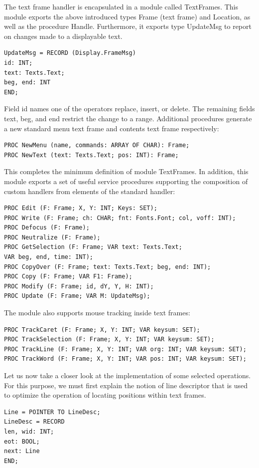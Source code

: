 The text frame handler is encapsulated in a module called TextFrames. This module exports the
above introduced types Frame (text frame) and Location, as well as the procedure Handle.
Furthermore, it exports type UpdateMsg to report on changes made to a displayable text.
\begin{verbatim}
UpdateMsg = RECORD (Display.FrameMsg)
id: INT;
text: Texts.Text;
beg, end: INT
END;
\end{verbatim}

Field id names one of the operators replace, insert, or delete. The remaining fields text, beg, and
end restrict the change to a range. Additional procedures generate a new standard menu text frame
and contents text frame respectively:
\begin{verbatim}
PROC NewMenu (name, commands: ARRAY OF CHAR): Frame;
PROC NewText (text: Texts.Text; pos: INT): Frame;
\end{verbatim}

This completes the minimum definition of module TextFrames. In addition, this module exports a
set of useful service procedures supporting the composition of custom handlers from elements of
the standard handler:
\begin{verbatim}
PROC Edit (F: Frame; X, Y: INT; Keys: SET);
PROC Write (F: Frame; ch: CHAR; fnt: Fonts.Font; col, voff: INT);
PROC Defocus (F: Frame);
PROC Neutralize (F: Frame);
PROC GetSelection (F: Frame; VAR text: Texts.Text;
VAR beg, end, time: INT);
PROC CopyOver (F: Frame; text: Texts.Text; beg, end: INT);
PROC Copy (F: Frame; VAR F1: Frame);
PROC Modify (F: Frame; id, dY, Y, H: INT);
PROC Update (F: Frame; VAR M: UpdateMsg);
\end{verbatim}

The module also supports mouse tracking inside text frames:
\begin{verbatim}
PROC TrackCaret (F: Frame; X, Y: INT; VAR keysum: SET);
PROC TrackSelection (F: Frame; X, Y: INT; VAR keysum: SET);
PROC TrackLine (F: Frame; X, Y: INT; VAR org: INT; VAR keysum: SET);
PROC TrackWord (F: Frame; X, Y: INT; VAR pos: INT; VAR keysum: SET);
\end{verbatim}

Let us now take a closer look at the implementation of some selected operations. For this purpose,
we must first explain the notion of line descriptor that is used to optimize the operation of locating
positions within text frames.
\begin{verbatim}
Line = POINTER TO LineDesc;
LineDesc = RECORD
len, wid: INT;
eot: BOOL;
next: Line
END;
\end{verbatim}

